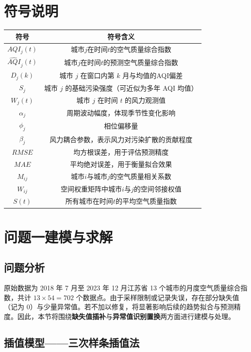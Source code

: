 \documentclass[a4paper,12pt]{article}
\begin{document}
	\section{符号说明}
	\label{sec:notation}
	\begin{center}
		\begin{tabular}{c c}
			\toprule
			符号 & 符号含义 \\
			\midrule
			$AQI_j(t)$ & 城市$j$在时间$t$的空气质量综合指数 \\
			$\widehat{AQI}_j(t)$ & 城市$j$在时间$t$的预测空气质量综合指数 \\
			$D_j(k)$ & 城市 $j$ 在窗口内第 $k$ 月与均值的AQI偏差 \\
		  	$S_j$ & 城市 $j$ 的基础污染强度（可近似为多年 AQI 均值）\\
			$W_j(t)$ & 城市 $j$ 在时间 $t$ 的风力观测值\\
			$\alpha_j$ & 周期波动幅度，体现季节性变化影响\\
			$\phi_j$ & 相位偏移量\\
			$\beta_j$ & 风力耦合参数，表示风力对污染扩散的贡献程度\\
			$RMSE$ & 均方根误差，用于评估预测精度 \\
			$MAE$ & 平均绝对误差，用于衡量拟合效果 \\
			$M_{ij}$ & 城市$i$与城市$j$的空气质量相关系数 \\
			$W_{ij}$ & 空间权重矩阵中城市$i$与$j$的空间邻接权值 \\
			$S(t)$ & 所有城市在时间$t$的平均空气质量指数 \\
			\bottomrule
		\end{tabular}
	\end{center}
	
	
	\section{问题一建模与求解}
	
	\subsection{问题分析}
	
	原始数据为 2018 年 7 月至 2023 年 12 月江苏省 13 个城市的月度空气质量综合指数，共计 $13 \times 54 = 702$ 个数据点。由于采样限制或记录失误，存在部分缺失值（记为 0）与少量异常值。若不加以修复，将显著影响后续的趋势拟合与预测精度。因此，本节将围绕\textbf{缺失值插补}与\textbf{异常值识别置换}两方面进行建模与处理。
	
	\subsection{插值模型——三次样条插值法}
	
\end{document}
